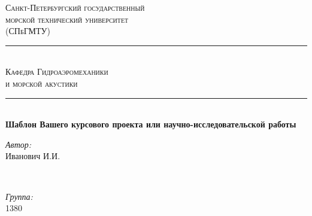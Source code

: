 \documentclass[11pt]{article}
\begin{document}
\begin{titlepage}

\newcommand{\HRule}{\rule{\linewidth}{0.2mm}} %

\center %
 
\textsc{Санкт-Петербургский государственный\\морской технический университет\\(СПбГМТУ)}\\ %

\HRule\\[0.5cm]
\textsc{\Large Кафедра Гидроаэромеханики\\и морской акустики}\\[0.5cm] %
\HRule\\[1cm]


\huge{\bfseries{Шаблон Вашего курсового проекта или научно-исследовательской работы}}\\[1.5cm] %
 

\begin{minipage}{0.4\textwidth}
\begin{flushleft} \large
\emph{Автор:}\\
Иванович \textsc{И.И.} \\  %
\end{flushleft}
\end{minipage}
~
\begin{minipage}{0.4\textwidth}
\begin{flushright} \large
\emph{Группа:} \\
1380  \\ %
\end{flushright}
\end{minipage}\\[2cm]
 

\end{titlepage}
\end{document}
